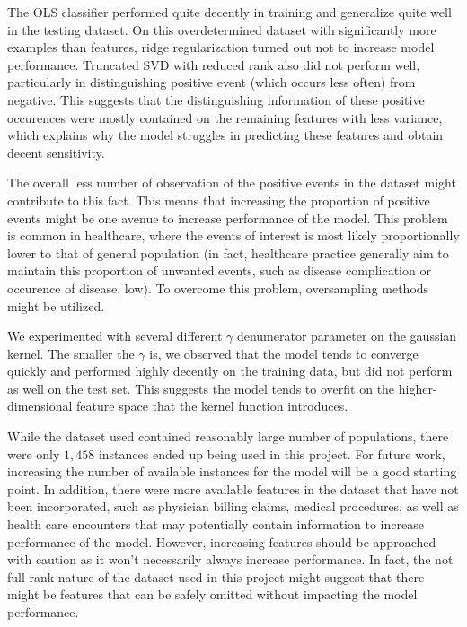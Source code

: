 \documentclass{article}
\begin{document}
The OLS classifier performed quite decently in training and generalize quite well in the testing dataset. On this overdetermined dataset with significantly more examples than features, ridge regularization turned out not to increase model performance. Truncated SVD with reduced rank also did not perform well, particularly in distinguishing positive event (which occurs less often) from negative. This suggests that the distinguishing information of these positive occurences were mostly contained on the remaining features with less variance, which explains why the model struggles in predicting these features and obtain decent sensitivity. 

The overall less number of  observation of the positive events in the dataset might contribute to this fact. This means that increasing the proportion of positive events might be one avenue to increase performance of the model. This problem is common in healthcare, where the events of interest is most likely proportionally lower to that of general population (in fact, healthcare practice generally aim to maintain this proportion of unwanted events, such as disease complication or occurence of disease, low). To overcome this problem, oversampling methods might be utilized.\cite{smote}

We experimented with several different $\gamma$ denumerator parameter on the gaussian kernel. The smaller the $\gamma$ is, we observed that the model tends to converge quickly and performed highly decently on the training data, but did not perform as well on the test set. This suggests the model tends to overfit on the higher-dimensional feature space that the kernel function introduces.

While the dataset used contained reasonably large number of populations, there were only $1,458$ instances ended up being used in this project. For future work, increasing the number of available instances for the model will be a good starting point. In addition, there were more available features in the dataset that have not been incorporated, such as physician billing claims, medical procedures, as well as health care encounters that may potentially contain information to increase performance of the model. However, increasing features should be approached with caution as it won't necessarily always increase performance. In fact, the not full rank nature of the dataset used in this project might suggest that there might be features that can be safely omitted without impacting the model performance. 

\pagebreak



\end{document}
